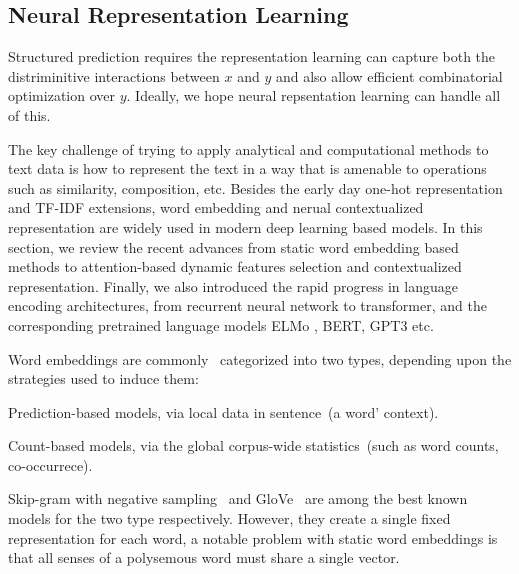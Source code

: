 \subsection{Neural Representation Learning}
\label{ssec:bg:rep-learning}
Structured prediction requires the representation learning can capture
both the distriminitive interactions between $x$ and $y$ and also
allow efficient combinatorial optimization over $y$. Ideally, we hope
neural repsentation learning can handle all of this.

The key challenge of trying to apply analytical and computational
methods to text data is how to represent the text in a way that is
amenable to operations such as similarity, composition, etc. Besides
the early day one-hot representation and TF-IDF extensions, word
embedding and nerual contextualized representation are widely used in
modern deep learning based models. In this section, we review the
recent advances from static word embedding based methods to
attention-based dynamic features selection and contextualized
representation. Finally, we also introduced the rapid progress in
language encoding architectures, from recurrent neural network to
transformer, and the corresponding pretrained language models ELMo ,
BERT, GPT3 etc.

Word embeddings are
commonly~\cite{Baroni:2014,pennington2014glove,li2015generative}
categorized into two types, depending upon the strategies used to
induce them:
\begin{inparaenum}[(1)]
\item Prediction-based models, via local data in sentence~(a word'
  context).
\item Count-based models, via the global corpus-wide statistics~(such
  as word counts, co-occurrece).
\end{inparaenum}
Skip-gram with negative sampling~\cite[SGNS,][]{mikolov13w2v} and
GloVe~\cite{pennington2014glove} are among the best known models for
the two type respectively. However, they create a single fixed
representation for each word, a notable problem with static word
embeddings is that all senses of a polysemous word must share a single
vector.

